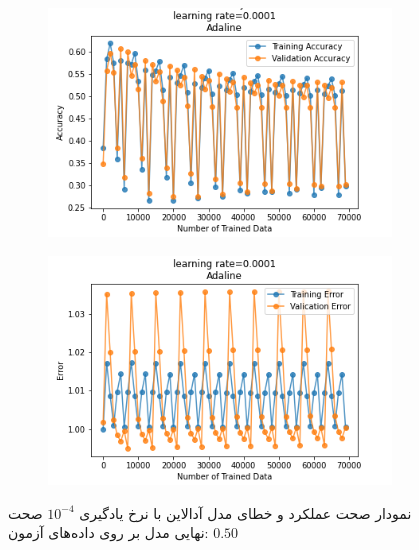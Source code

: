 \documentclass[12pt, a4paper]{article}
\begin{document}
\begin{figure}[h]
    \begin{subfigure}{0.45\linewidth}
        \centering
        \includegraphics[width=\linewidth]{images/5/adaline/lr/acc_0.0001.png}
    \end{subfigure}
    \hfil
    \begin{subfigure}{0.45\linewidth}
        \centering
        \includegraphics[width=\linewidth]{images/5/adaline/lr/error_0.0001.png}
    \end{subfigure}
    \caption{نمودار صحت عملکرد‌ و خطای مدل آدالاین با نرخ یادگیری $10^{-4}$
    \newline
    صحت نهایی مدل بر روی داده‌های آزمون: $0.50$}
\end{figure}
\end{document}
